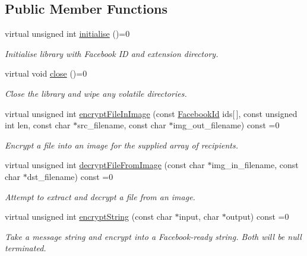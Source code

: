 \subsection*{Public Member Functions}
\begin{DoxyCompactItemize}
\item 
virtual unsigned int \hyperlink{classefb_1_1IFirefoxInterface_acd3325eac068a6e4a32dbd8bdf50d54b}{initialise} ()=0
\begin{DoxyCompactList}\small\item\em Initialise library with Facebook ID and extension directory. \item\end{DoxyCompactList}\item 
virtual void \hyperlink{classefb_1_1IFirefoxInterface_af6ee7eacbde6b379b68d954e44f6e549}{close} ()=0
\begin{DoxyCompactList}\small\item\em Close the library and wipe any volatile directories. \item\end{DoxyCompactList}\item 
virtual unsigned int \hyperlink{classefb_1_1IFirefoxInterface_ad827d43af3181b0b177817da74e873d8}{encryptFileInImage} (const \hyperlink{structefb_1_1FacebookId}{FacebookId} ids\mbox{[}$\,$\mbox{]}, const unsigned int len, const char $\ast$src\_\-filename, const char $\ast$img\_\-out\_\-filename) const =0
\begin{DoxyCompactList}\small\item\em Encrypt a file into an image for the supplied array of recipients. \item\end{DoxyCompactList}\item 
virtual unsigned int \hyperlink{classefb_1_1IFirefoxInterface_aaa517bbc318bd8032e01bea927032349}{decryptFileFromImage} (const char $\ast$img\_\-in\_\-filename, const char $\ast$dst\_\-filename) const =0
\begin{DoxyCompactList}\small\item\em Attempt to extract and decrypt a file from an image. \item\end{DoxyCompactList}\item 
virtual unsigned int \hyperlink{classefb_1_1IFirefoxInterface_aea1ea8467fe1857814a0842180b2379d}{encryptString} (const char $\ast$input, char $\ast$output) const =0
\begin{DoxyCompactList}\small\item\em Take a message string and encrypt into a Facebook-\/ready string. Both will be null terminated. \item\end{DoxyCompactList}\item 

\end{DoxyCompactItemize}
